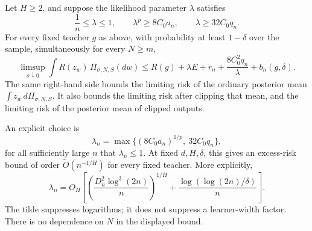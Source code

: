 \begin{theorem}
\label{thm:raw-gaussian-oracle}
Let $H\geq2$, and suppose the likelihood parameter $\lambda$ satisfies
\begin{equation}
 \frac1n\leq\lambda\leq1,\qquad
 \lambda^p\geq8C_0a_n,\qquad \lambda\geq32C_0q_n.
 \label{eq:raw-calibration}
\end{equation}
For every fixed teacher $g$ as above, with probability at least
$1-\delta$ over the sample, simultaneously for every $N\geq m$,
\begin{equation}
 \limsup_{\sigma\downarrow0}
   \int R(z_w)\,\Pi_{\sigma,N,S}(dw)
 \leq R(g)+\lambda E+r_n+\frac{8C_0^2q_n}{\lambda}
                 +b_n(g,\delta).
 \label{eq:raw-oracle}
\end{equation}
The same right-hand side bounds the limiting risk of the ordinary
posterior mean $\int z_w\,d\Pi_{\sigma,N,S}$.  It also bounds the limiting
risk after clipping that mean, and the limiting risk of the posterior
mean of clipped outputs.

An explicit choice is
\begin{equation}
 \lambda_n=\max\bigl\{(8C_0a_n)^{1/p},\ 32C_0q_n\bigr\},
 \label{eq:raw-explicit-schedule}
\end{equation}
for all sufficiently large $n$ that $\lambda_n\leq1$.  At fixed
$d,H,\delta$, this gives an excess-risk bound of order
$\widetilde O(n^{-1/H})$ for every fixed teacher.  More explicitly,
\[
 \lambda_n
  =O_H\!\left[
      \left(\frac{D_n^2\log^3(2n)}n\right)^{1/H}
      +\frac{\log(\log(2n)/\delta)}n\right].
\]
The tilde suppresses logarithms; it does not suppress a learner-width
factor.  There is no dependence on $N$ in the displayed bound.
\end{theorem}


